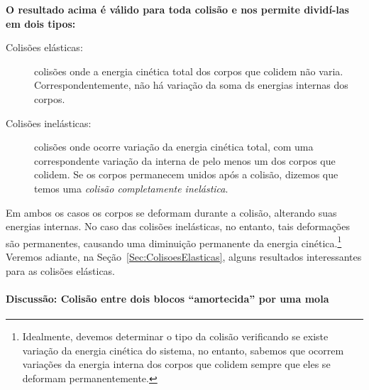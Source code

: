 \textbf{O resultado acima é válido para toda colisão e nos permite dividí-las em dois tipos:}
\begin{description}
    \item[Colisões elásticas:] colisões onde a energia cinética total dos corpos que colidem não varia. Correspondentemente, não há variação da soma ds energias internas dos corpos.
    
    \item[Colisões inelásticas:] colisões onde ocorre variação da energia cinética total, com uma correspondente variação da interna de pelo menos um dos corpos que colidem. Se os corpos permanecem unidos após a colisão, dizemos que temos uma \emph{colisão completamente inelástica}.
\end{description}
%
Em ambos os casos os corpos se deformam durante a colisão, alterando suas energias internas. No caso das colisões inelásticas, no entanto, tais deformações são permanentes, causando uma diminuição permanente da energia cinética.\footnote[][-10cm]{Idealmente, devemos determinar o tipo da colisão verificando se existe variação da energia cinética do sistema, no entanto, sabemos que ocorrem variações da energia interna dos corpos que colidem sempre que eles se deformam permanentemente.} Veremos adiante, na Seção~\ref{Sec:ColisoesElasticas}, alguns resultados interessantes para as colisões elásticas.



\paragraph{Discussão: Colisão entre dois blocos ``amortecida'' por uma mola}

